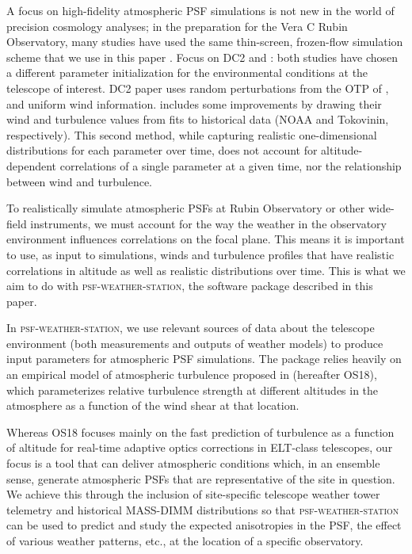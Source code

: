 \documentclass[twocolumn]{aastex631}
\newcommand{\psfws}{\textsc{psf-weather-station}\xspace}
\newcommand{\osborn}{OS18\xspace}
\begin{document}
A focus on high-fidelity atmospheric PSF simulations is not new in the world of precision cosmology analyses; in the preparation for the Vera C Rubin Observatory, many studies have used the same thin-screen, frozen-flow simulation scheme that we use in this paper \citep{jee_toward_2011, chang_atmospheric_2012, peterson_simulation_2015,lsst_dark_energy_science_collaboration_lsst_2021}.
Focus on DC2 and \cite{peterson_simulation_2015}: both studies have chosen a different parameter initialization for the environmental conditions at the telescope of interest. 
DC2 paper uses random perturbations from the OTP of \cite{ellerbroek_efficient_2002}, and uniform wind information.
\cite{peterson_simulation_2015} includes some improvements by drawing their wind and turbulence values from fits to historical data (NOAA and Tokovinin, respectively).
This second method, while capturing realistic one-dimensional distributions for each parameter over time, does not account for altitude-dependent correlations of a single parameter at a given time, nor the relationship between wind and turbulence.

To realistically simulate atmospheric PSFs at Rubin Observatory or other wide-field instruments, we must account for the way the weather in the observatory environment influences correlations on the focal plane.
This means it is important to use, as input to simulations, winds and turbulence profiles that have realistic correlations in altitude as well as realistic distributions over time.
This is what we aim to do with \psfws, the software package described in this paper.

In \psfws, we use relevant sources of data about the telescope environment (both measurements and outputs of weather models) to produce input parameters for atmospheric PSF simulations.
The package  relies heavily on an empirical model of atmospheric turbulence proposed in \cite{osborn_optical_2018} (hereafter \osborn), which parameterizes relative turbulence strength at different altitudes in the atmosphere as a function of the wind shear at that location. 

Whereas \osborn focuses mainly on the fast prediction of turbulence as a function of altitude for real-time adaptive optics corrections in ELT-class telescopes, our focus is a tool that can deliver atmospheric conditions which, in an ensemble sense, generate atmospheric PSFs that are representative of the site in question.
We achieve this through the inclusion of site-specific telescope weather tower telemetry and historical MASS-DIMM distributions so that
\psfws can be used to predict and study the expected anisotropies in the PSF, the effect of various weather patterns, etc., at the location of a specific observatory.
\end{document}
